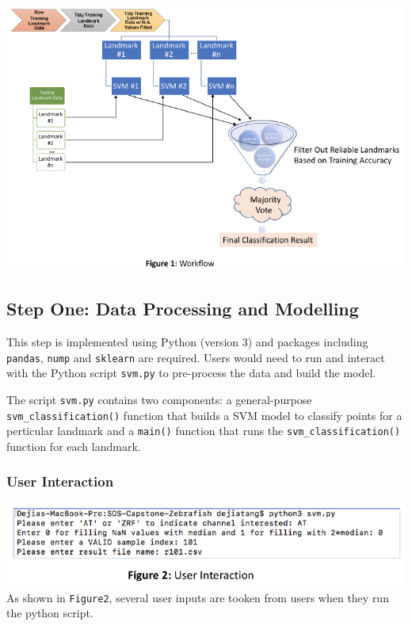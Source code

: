 \documentclass[10pt,letterpaper]{article}
\begin{document}
\includegraphics{zebrafish_paper_files/figure-latex/unnamed-chunk-2-1.pdf}

\subsection{Step One: Data Processing and
Modelling}\label{step-one-data-processing-and-modelling}

This step is implemented using Python (version 3) and packages including
\texttt{pandas}, \texttt{nump} and \texttt{sklearn} are required. Users
would need to run and interact with the Python script \texttt{svm.py} to
pre-process the data and build the model.

The script \texttt{svm.py} contains two components: a general-purpose
\texttt{svm\_classification()} function that builds a SVM model to
classify points for a perticular landmark and a \texttt{main()} function
that runs the \texttt{svm\_classification()} function for each landmark.

\subsubsection{User Interaction}\label{user-interaction}

\includegraphics{zebrafish_paper_files/figure-latex/unnamed-chunk-3-1.pdf}
As shown in \texttt{Figure2}, several user inputs are tooken from users
when they run the python script.
\end{document}

